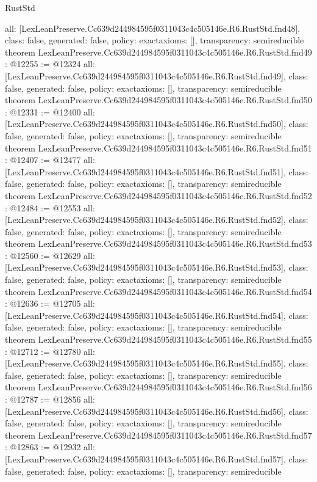 \begin{lexlean}{RustStd}
\begin{coremodule}
{  all: [LexLeanPreserve.Cc639d244984595f0311043c4c505146e.R6.RustStd.fnd48],
  class: false,
  generated: false,
  policy: exact{axioms: []},
  transparency: semireducible
}
theorem LexLeanPreserve.Cc639d244984595f0311043c4c505146e.R6.RustStd.fnd49 : @12255 := @12324 {
  all: [LexLeanPreserve.Cc639d244984595f0311043c4c505146e.R6.RustStd.fnd49],
  class: false,
  generated: false,
  policy: exact{axioms: []},
  transparency: semireducible
}
theorem LexLeanPreserve.Cc639d244984595f0311043c4c505146e.R6.RustStd.fnd50 : @12331 := @12400 {
  all: [LexLeanPreserve.Cc639d244984595f0311043c4c505146e.R6.RustStd.fnd50],
  class: false,
  generated: false,
  policy: exact{axioms: []},
  transparency: semireducible
}
theorem LexLeanPreserve.Cc639d244984595f0311043c4c505146e.R6.RustStd.fnd51 : @12407 := @12477 {
  all: [LexLeanPreserve.Cc639d244984595f0311043c4c505146e.R6.RustStd.fnd51],
  class: false,
  generated: false,
  policy: exact{axioms: []},
  transparency: semireducible
}
theorem LexLeanPreserve.Cc639d244984595f0311043c4c505146e.R6.RustStd.fnd52 : @12484 := @12553 {
  all: [LexLeanPreserve.Cc639d244984595f0311043c4c505146e.R6.RustStd.fnd52],
  class: false,
  generated: false,
  policy: exact{axioms: []},
  transparency: semireducible
}
theorem LexLeanPreserve.Cc639d244984595f0311043c4c505146e.R6.RustStd.fnd53 : @12560 := @12629 {
  all: [LexLeanPreserve.Cc639d244984595f0311043c4c505146e.R6.RustStd.fnd53],
  class: false,
  generated: false,
  policy: exact{axioms: []},
  transparency: semireducible
}
theorem LexLeanPreserve.Cc639d244984595f0311043c4c505146e.R6.RustStd.fnd54 : @12636 := @12705 {
  all: [LexLeanPreserve.Cc639d244984595f0311043c4c505146e.R6.RustStd.fnd54],
  class: false,
  generated: false,
  policy: exact{axioms: []},
  transparency: semireducible
}
theorem LexLeanPreserve.Cc639d244984595f0311043c4c505146e.R6.RustStd.fnd55 : @12712 := @12780 {
  all: [LexLeanPreserve.Cc639d244984595f0311043c4c505146e.R6.RustStd.fnd55],
  class: false,
  generated: false,
  policy: exact{axioms: []},
  transparency: semireducible
}
theorem LexLeanPreserve.Cc639d244984595f0311043c4c505146e.R6.RustStd.fnd56 : @12787 := @12856 {
  all: [LexLeanPreserve.Cc639d244984595f0311043c4c505146e.R6.RustStd.fnd56],
  class: false,
  generated: false,
  policy: exact{axioms: []},
  transparency: semireducible
}
theorem LexLeanPreserve.Cc639d244984595f0311043c4c505146e.R6.RustStd.fnd57 : @12863 := @12932 {
  all: [LexLeanPreserve.Cc639d244984595f0311043c4c505146e.R6.RustStd.fnd57],
  class: false,
  generated: false,
  policy: exact{axioms: []},
  transparency: semireducible
}
\end{coremodule}
\end{lexlean}
